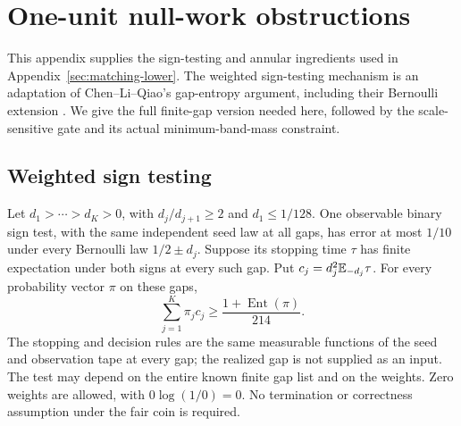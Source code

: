 \section{One-unit null-work obstructions}\label{sec:lower-foundations}

This appendix supplies the sign-testing and annular ingredients used in
Appendix~\ref{sec:matching-lower}. The weighted sign-testing mechanism is
an adaptation of Chen--Li--Qiao's gap-entropy argument, including their
Bernoulli extension \cite[Lemma 4.1 and Remark D.4]{clq}. We give the full
finite-gap version needed here, followed by the scale-sensitive gate and
its actual minimum-band-mass constraint.

\subsection{Weighted sign testing}

\begin{lemma}\label{lem:weighted-sign}
Let $d_1>\cdots>d_K>0$, with $d_j/d_{j+1}\ge2$ and $d_1\le1/128$.
One observable binary sign test, with the same independent seed law at all
gaps, has error at most $1/10$ under every Bernoulli law $1/2\pm d_j$.
Suppose its stopping time $\tau$ has finite expectation under both signs at
every such gap.  Put $c_j=d_j^2\mathbb E_{-d_j}\tau$.
For every probability vector $\pi$ on these gaps,
\begin{equation}\label{eq:sc-weighted-sign}
 \sum_{j=1}^K\pi_jc_j\ge
 \frac{1+\operatorname{Ent}(\pi)}{214}.
\end{equation}
The stopping and decision rules are the same measurable functions of the
seed and observation tape at every gap; the realized gap is not supplied
as an input. The test may depend on the entire known finite gap list and
on the weights. Zero weights are allowed, with $0\log(1/0)=0$.
No termination or correctness assumption under the fair coin is required.
\end{lemma}

